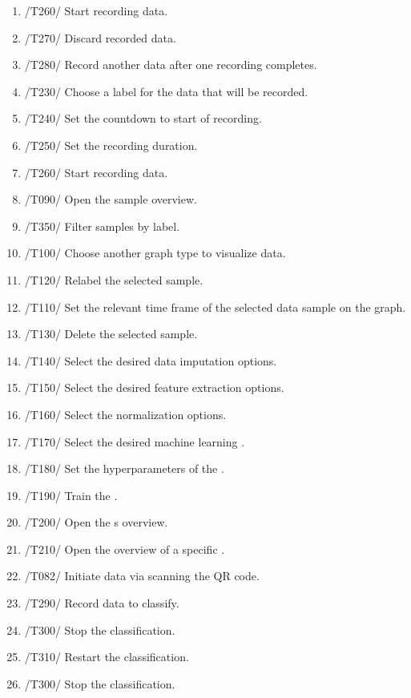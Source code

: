 \begin{enumerate}
    \item /T260/ Start recording data.
    \item /T270/ Discard recorded data.
    \item /T280/ Record another data after one recording completes.
    \item /T230/ Choose a \gls{label} for the data that will be recorded.
    \item /T240/ Set the countdown to start of recording.
    \item /T250/ Set the recording duration.
    \item /T260/ Start recording data.
    \item /T090/ Open the sample overview.
    \item /T350/ Filter samples by label.
    \item /T100/ Choose another graph type to visualize data.
    \item /T120/ Relabel the selected sample.
    \item /T110/ Set the relevant time frame of the selected \gls{data sample} on the graph.
    \item /T130/ Delete the selected sample.
    \item /T140/ Select the desired data imputation options.
    \item /T150/ Select the desired \gls{feature extraction} options.
    \item /T160/ Select the normalization options.
    \item /T170/ Select the desired machine learning .
    \item /T180/ Set the hyperparameters of the .
    \item /T190/ Train the .
    \item /T200/ Open the s overview. 
    \item /T210/ Open the overview of a specific .
    \item /T082/ Initiate data via scanning the \gls{QR code}.
    \item /T290/ Record data to classify. 
    \item /T300/ Stop the \gls{classification}.
    \item /T310/ Restart the \gls{classification}.
    \item /T300/ Stop the \gls{classification}.
\end{enumerate}
